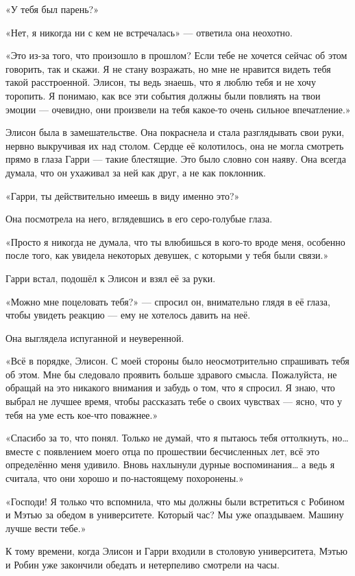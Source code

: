 \documentclass[a5paper, 9pt,
final, openany, twoside=true]{memoir}
\begin{document}
«У тебя был парень?»

«Нет, я никогда ни с кем не встречалась» — ответила она неохотно.

«Это из-за того, что произошло в прошлом? Если тебе не хочется сейчас об этом говорить, так и скажи. Я не стану возражать, но мне не нравится видеть тебя такой расстроенной. Элисон, ты ведь знаешь, что я люблю тебя и не хочу торопить. Я понимаю, как все эти события должны были повлиять на твои эмоции — очевидно, они произвели на тебя какое-то очень сильное впечатление.»

Элисон была в замешательстве. Она покраснела и стала разглядывать свои руки, нервно выкручивая их над столом. Сердце её колотилось, она не могла смотреть прямо в глаза Гарри — такие блестящие. Это было словно сон наяву. Она всегда думала, что он ухаживал за ней как друг, а не как поклонник.

«Гарри, ты действительно имеешь в виду именно это?»

Она посмотрела на него, вглядевшись в его серо-голубые глаза.

«Просто я никогда не думала, что ты влюбишься в кого-то вроде меня, особенно после того, как увидела некоторых девушек, с которыми у тебя были связи.»

Гарри встал, подошёл к Элисон и взял её за руки.

«Можно мне поцеловать тебя?» — спросил он, внимательно глядя в её глаза, чтобы увидеть реакцию — ему не хотелось давить на неё.

Она выглядела испуганной и неуверенной.

«Всё в порядке, Элисон. С моей стороны было неосмотрительно спрашивать тебя об этом. Мне бы следовало проявить больше здравого смысла. Пожалуйста, не обращай на это никакого внимания и забудь о том, что я спросил. Я знаю, что выбрал не лучшее время, чтобы рассказать тебе о своих чувствах — ясно, что у тебя на уме есть кое-что поважнее.»

«Спасибо за то, что понял. Только не думай, что я пытаюсь тебя оттолкнуть, но… вместе с появлением моего отца по прошествии бесчисленных лет, всё это определённо меня удивило. Вновь нахлынули дурные воспоминания… а ведь я считала, что они хорошо и по-настоящему похоронены.»

«Господи! Я только что вспомнила, что мы должны были встретиться с Робином и Мэтью за обедом в университете. Который час? Мы уже опаздываем. Машину лучше вести тебе.»\bigskip

К тому времени, когда Элисон и Гарри входили в столовую университета, Мэтью и Робин уже закончили обедать и нетерпеливо смотрели на часы.
\end{document}
